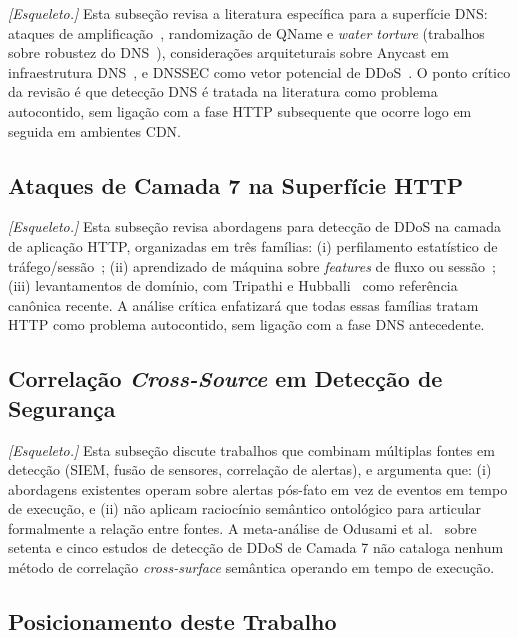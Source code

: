 \documentclass[preprint,12pt]{elsarticle}
\begin{document}
\textit{[Esqueleto.]} Esta subseção revisa a literatura específica para a superfície DNS: ataques de amplificação~\cite{anagnostopoulos2013dns}, randomização de QName e \emph{water torture} (trabalhos sobre robustez do DNS~\cite{pappas2009dns}), considerações arquiteturais sobre Anycast em infraestrutura DNS~\cite{moura2016anycast}, e DNSSEC como vetor potencial de DDoS~\cite{vanrijswijk2014dnssec}. O ponto crítico da revisão é que detecção DNS é tratada na literatura como problema autocontido, sem ligação com a fase HTTP subsequente que ocorre logo em seguida em ambientes CDN.

\subsection{Ataques de Camada 7 na Superfície HTTP}

\textit{[Esqueleto.]} Esta subseção revisa abordagens para detecção de DDoS na camada de aplicação HTTP, organizadas em três famílias: (i) perfilamento estatístico de tráfego/sessão~\cite{fernandes2015autonomous,bharathi2012pca}; (ii) aprendizado de máquina sobre \emph{features} de fluxo ou sessão~\cite{kemp2023approach}; (iii) levantamentos de domínio, com Tripathi e Hubballi~\cite{tripathi2021application} como referência canônica recente. A análise crítica enfatizará que todas essas famílias tratam HTTP como problema autocontido, sem ligação com a fase DNS antecedente.

\subsection{Correlação \emph{Cross-Source} em Detecção de Segurança}

\textit{[Esqueleto.]} Esta subseção discute trabalhos que combinam múltiplas fontes em detecção (SIEM, fusão de sensores, correlação de alertas), e argumenta que: (i) abordagens existentes operam sobre alertas pós-fato em vez de eventos em tempo de execução, e (ii) não aplicam raciocínio semântico ontológico para articular formalmente a relação entre fontes. A meta-análise de Odusami et al.~\cite{odusami2020survey} sobre setenta e cinco estudos de detecção de DDoS de Camada 7 não cataloga nenhum método de correlação \emph{cross-surface} semântica operando em tempo de execução.

\subsection{Posicionamento deste Trabalho}
\end{document}
